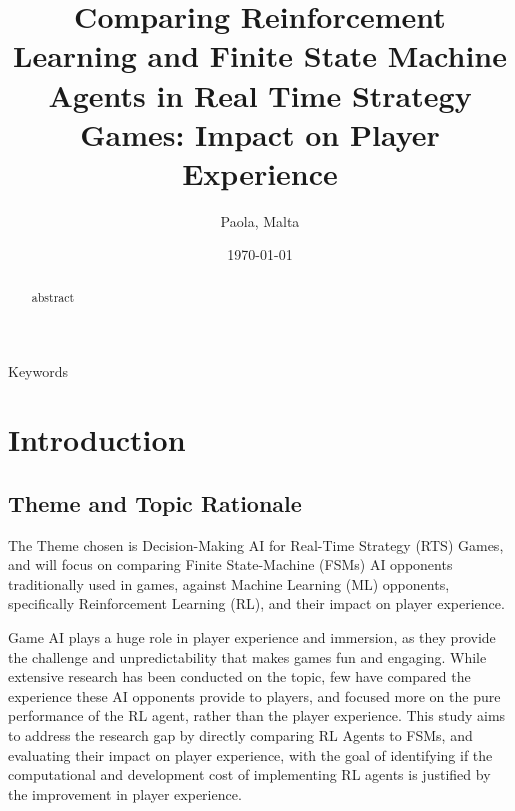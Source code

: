 \documentclass[conference]{IEEEtran}
\begin{document}
\title{Comparing Reinforcement Learning and Finite State Machine Agents in Real Time Strategy Games: Impact on Player Experience}

\author{
Paola, Malta
}

\date{\today}

\maketitle

\begin{abstract}
abstract
\end{abstract}

\begin{IEEEkeywords}
Keywords
\end{IEEEkeywords}

\section{Introduction}

\subsection{Theme and Topic Rationale}

The Theme chosen is Decision-Making AI for Real-Time Strategy (RTS) Games, and will focus on comparing Finite State-Machine (FSMs) AI opponents traditionally used in games, against Machine Learning (ML) opponents, specifically 
Reinforcement Learning (RL), and their impact on player experience. 

Game AI plays a huge role in player experience and immersion, as they provide the challenge and unpredictability that makes games fun and engaging.
While extensive research has been conducted on the topic, few have compared the experience these AI opponents provide to players, and focused more on the pure performance of the RL agent, rather than the
player experience. This study aims to address the research gap by directly comparing RL Agents to FSMs, and evaluating their impact on player experience, with the goal of identifying if the computational
and development cost of implementing RL agents is justified by the improvement in player experience.
\end{document}
